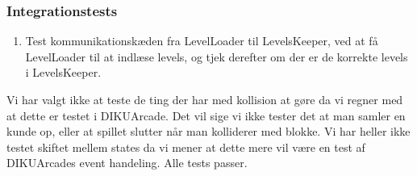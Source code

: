    \subsubsection{Integrationstests}
      \begin{enumerate}
         \item Test kommunikationskæden fra LevelLoader til LevelsKeeper, ved at få LevelLoader til at indlæse levels, og tjek derefter om der er de korrekte levels i LevelsKeeper.
      \end{enumerate}
      Vi har valgt ikke at teste de ting der har med kollision at gøre da vi regner med at dette er testet i DIKUArcade. Det vil sige vi ikke tester det at man samler en kunde op, eller at spillet slutter når man kolliderer med blokke. Vi har heller ikke testet skiftet mellem states da vi mener at dette mere vil være en test af DIKUArcades event handeling. Alle tests passer.